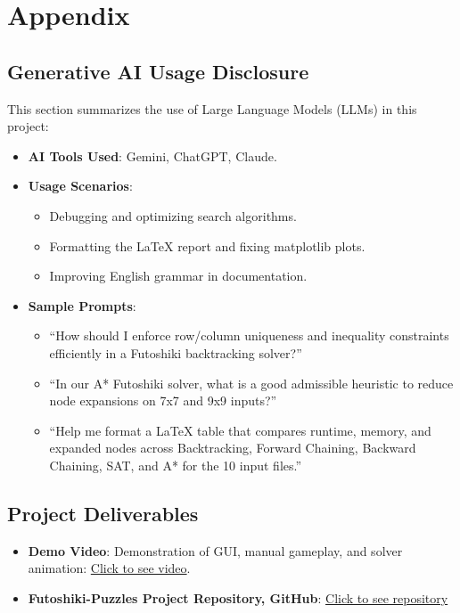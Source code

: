 \appendix
\section{Appendix}
\subsection{Generative AI Usage Disclosure}
This section summarizes the use of Large Language Models (LLMs) in this project:
\begin{itemize}
	\item \textbf{AI Tools Used}: Gemini, ChatGPT, Claude.
	\item \textbf{Usage Scenarios}:
	\begin{itemize}
		\item Debugging and optimizing search algorithms.
		\item Formatting the LaTeX report and fixing matplotlib plots.
		\item Improving English grammar in documentation.
	\end{itemize}
	\item \textbf{Sample Prompts}:
	\begin{itemize}
		\item ``How should I enforce row/column uniqueness and inequality constraints efficiently in a Futoshiki backtracking solver?''
		\item ``In our A* Futoshiki solver, what is a good admissible heuristic to reduce node expansions on 7x7 and 9x9 inputs?''
		\item ``Help me format a LaTeX table that compares runtime, memory, and expanded nodes across Backtracking, Forward Chaining, Backward Chaining, SAT, and A* for the 10 input files.''
	\end{itemize}
\end{itemize}

\subsection{Project Deliverables}
\begin{itemize}
	\item \textbf{Demo Video}: Demonstration of GUI, manual gameplay, and solver animation: \href{https://www.youtube.com/watch?v=25V7OLtf4e8}{Click to see video}.
	\item \textbf{Futoshiki-Puzzles Project Repository, GitHub}: \href{https://github.com/Chistaif/Futoshiki-Puzzles}{Click to see repository}
\end{itemize}
